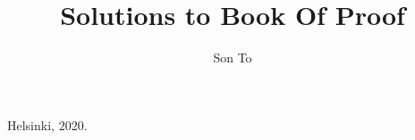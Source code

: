 \documentclass[a4paper,11pt]{memoir}
\begin{document}
  \title{Solutions to Book Of Proof}
  \author{Son To}

  \maketitle
  Helsinki, 2020.
\end{document}
